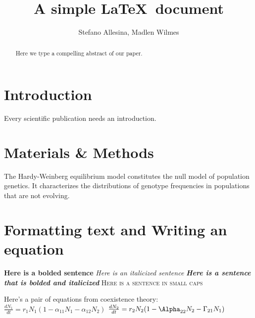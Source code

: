 \documentclass[12pt]{article}
\title{A simple \LaTeX\ document}
\author{Stefano Allesina, Madlen Wilmes}
\date{}
\begin{document}
\maketitle
\begin{abstract}
Here we type a compelling abstract of our paper.
\end{abstract}
\section{Introduction}
Every scientific publication needs an introduction.
\section{Materials \& Methods}
The Hardy-Weinberg equilibrium model constitutes the null model of population genetics. It characterizes the distributions of genotype  frequencies in populations that are not evolving.

\section{Formatting text and Writing an equation}

\textbf{Here is a bolded sentence}     
\newline
\textit{Here is an italicized sentence}     
\newline
\textit{\textbf{Here is a sentence that is bolded and italicized}}    
\newline
\textsc{Here is a sentence in small caps}   
\newline

Here's a pair of equations from coexistence theory:
\newline
$\frac{dN_{1}}{dt} = r_{1}N_{1} (1 - \alpha_{11}N_{1} - \alpha_{12}N_{2})$
$\frac{dN_{2}}{dt} = r_{2}N_{2} (1 - \Alpha_{22}N_{2} - \Gamma_{21}N_{1})$
\end{document}
